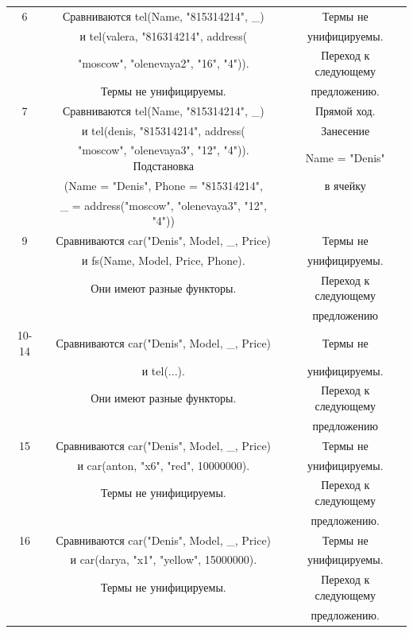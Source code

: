 \documentclass[12pt]{report}
\begin{document}
        \begin{table}[H]
        	\begin{center}
        		\begin{tabular}{|c c c |} 
			\hline
		    6 & Сравниваются tel(Name, "815314214", \_) & Термы не \\
			  & и tel(valera, "816314214", address( & унифицируемы. \\
			  & "moscow", "olenevaya2", "16", "4")).  & Переход к следующему \\
			  & Термы не унифицируемы. & предложению. \\
			\hline
			7 & Сравниваются tel(Name, "815314214", \_) & Прямой ход. \\
			  & и tel(denis, "815314214", address( & Занесение \\
			  & "moscow", "olenevaya3", "12", "4")). Подстановка & Name = "Denis"{} \\
			  & (Name = "Denis", Phone = "815314214"{}, & в ячейку\\
			  & \_ = address("moscow", "olenevaya3", "12", "4"{})) &\\
			\hline
			9 & Сравниваются car("Denis", Model, \_, Price) & Термы не \\
			  & и fs(Name, Model, Price, Phone). & унифицируемы. \\
			  & Они имеют разные функторы. &Переход к следующему \\
			  & & предложению\\
			\hline
			10-14 & Сравниваются car("Denis", Model, \_, Price) & Термы не \\
			  & и tel(...). & унифицируемы. \\
			  & Они имеют разные функторы. &Переход к следующему \\
			  & & предложению\\
			\hline
			15 & Сравниваются car("Denis", Model, \_, Price) & Термы не \\
			  & и car(anton, "x6", "red", 10000000). & унифицируемы. \\
			  & Термы не унифицируемы. & Переход к следующему \\
			  & & предложению. \\
			\hline
			16 & Сравниваются car("Denis", Model, \_, Price) & Термы не \\
			  & и car(darya, "x1", "yellow", 15000000). & унифицируемы. \\
			  & Термы не унифицируемы. & Переход к следующему \\
			  & & предложению. \\

\end{tabular}
\end{center}
\end{table}
\end{document}
